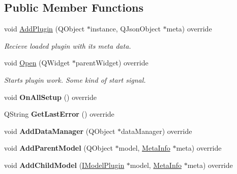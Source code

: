 \subsection*{Public Member Functions}
\begin{DoxyCompactItemize}
\item 
void \hyperlink{class_main_menu_model_plugin_aedb87208e81b8ee847fc694805364288}{Add\+Plugin} (Q\+Object $\ast$instance, Q\+Json\+Object $\ast$meta) override
\begin{DoxyCompactList}\small\item\em Recieve loaded plugin with it\textquotesingle{}s meta data. \end{DoxyCompactList}\item 
void \hyperlink{class_main_menu_model_plugin_a2eb04afbe1c9a301a7031816f37018ab}{Open} (Q\+Widget $\ast$parent\+Widget) override
\begin{DoxyCompactList}\small\item\em Starts plugin work. Some kind of \textquotesingle{}start\textquotesingle{} signal. \end{DoxyCompactList}\item 
\mbox{\label{class_main_menu_model_plugin_a560982062f2b3a5227dd5a9e921bad84}} 
void {\bfseries On\+All\+Setup} () override
\item 
\mbox{\label{class_main_menu_model_plugin_aec44d8d7a4a40b1d7a008e2612549419}} 
Q\+String {\bfseries Get\+Last\+Error} () override
\item 
\mbox{\label{class_main_menu_model_plugin_adfd74879db8365c33705e6ff3b8c1606}} 
void {\bfseries Add\+Data\+Manager} (Q\+Object $\ast$data\+Manager) override
\item 
\mbox{\label{class_main_menu_model_plugin_ac441401b496ad4412a94e0e3c17a2d78}} 
void {\bfseries Add\+Parent\+Model} (Q\+Object $\ast$model, \hyperlink{struct_meta_info}{Meta\+Info} $\ast$meta) override
\item 
\mbox{\label{class_main_menu_model_plugin_af4f21091cb24559de4485230ace97bd3}} 
void {\bfseries Add\+Child\+Model} (\hyperlink{class_i_model_plugin}{I\+Model\+Plugin} $\ast$model, \hyperlink{struct_meta_info}{Meta\+Info} $\ast$meta) override

\end{DoxyCompactItemize}
